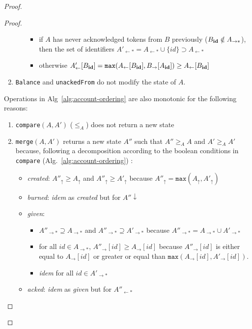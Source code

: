 \documentclass[9pt, oneside]{article}   	%
\begin{document}
\begin{proof}
\begin{proof}
\begin{enumerate}
\begin{itemize}
				\begin{itemize}
					\item if $A$ has never acknowledged tokens from $B$ previously ($B_{\scriptsize\textbf{id}} \notin A_{\rightarrow *}$), then the set of identifiers $A'_{\leftarrow *} = A_{\leftarrow *} \cup \{ id \} \supset A_{\leftarrow *}$
					\item otherwise $A'_{\leftarrow}[B_{\scriptsize\textbf{id}}] =  \texttt{max}(A_{\leftarrow}[B_{\scriptsize\textbf{id}}], B_{\rightarrow}[A_{\scriptsize\textbf{id}}]) \geq A_{\leftarrow}[B_{\scriptsize\textbf{id}}]$
				\end{itemize}
	 	\end{itemize}
	\item \texttt{Balance} and \texttt{unackedFrom} do not modify the state of $A$.
\end{enumerate}

Operations in Alg~\ref{alg:account-ordering} are also monotonic for the following reasons:
\begin{enumerate}
	\item \texttt{compare}$(A,A')$ ($\leq_A$) does not return a new state
	\item \texttt{merge}$(A,A')$ returns a new state $A''$ such that $A'' \geq_A A$ and $A' \geq_A A'$ because, following a decomposition according to the boolean conditions in \texttt{compare} (Alg.~\ref{alg:account-ordering}) :
		\begin{itemize}
			\item \textit{created}: $A''_\uparrow \geq A_\uparrow$ and $A''_\uparrow \geq A'_\uparrow$ because $A''_\uparrow = \texttt{max}(A_\uparrow, A'_\uparrow)$ 
			\item \textit{burned}: \textit{idem} as \textit{created} but for $A''\downarrow$ 
			\item \textit{given}:
				\begin{itemize}
					\item $A''_{\rightarrow *} \supseteq A_{\rightarrow *}$ and $A''_{\rightarrow *} \supseteq A'_{\rightarrow *}$ because $A''_{\rightarrow *} = A_{\rightarrow *} \cup A'_{\rightarrow *}$
					\item for all $id \in A_{\rightarrow *}$, $A''_{\rightarrow}[id] \geq A_{\rightarrow}[id]$ because $A''_{\rightarrow}[id]$ is either equal to $A_{\rightarrow}[id]$ or greater or equal than $\texttt{max}(A_{\rightarrow}[id], A'_{\rightarrow}[id])$.
					\item \textit{idem} for all $id \in  A'_{\rightarrow *}$
				\end{itemize}
			\item \textit{acked}: \textit{idem} as \textit{given} but for $A''_{\leftarrow *}$ 
		\end{itemize}
\end{enumerate}



\end{proof}
\end{proof}
\end{document}
